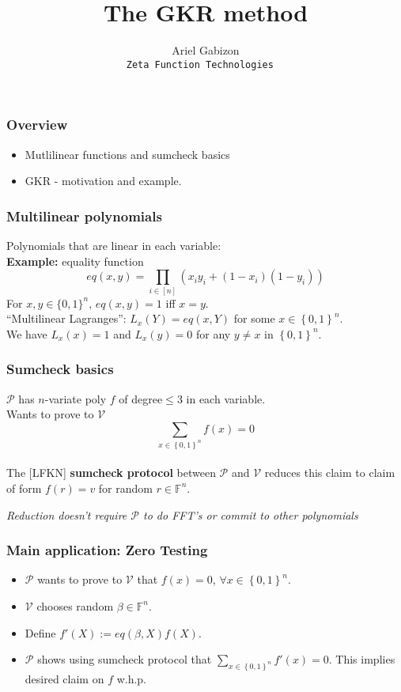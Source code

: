 \documentclass[shadesubsections,compress,14pt,mathserif]{beamer}
\title{\large{The GKR method}}    %
\author{\small{Ariel Gabizon}\\                 %
\tt{\footnotesize{Zeta Function Technologies}                                       } }      %
\date{}                    %
\newcommand{\F}{\ensuremath{{\mathbb F}}}
\newcommand{\set}[1]{\ensuremath{\left\{#1\right\}}}
\newcommand{\bin}{\ensuremath{\set{0,1}}}
\newcommand{\cube}{\ensuremath{\bin^n}}
\newcommand{\defeq}{\ensuremath{:=}}
\newcommand{\ver}{\ensuremath{\mathcal{V}}}
\newcommand{\prv}{\ensuremath{\mathcal{P}}}
\newcommand{\nl}{\\ \pause \vspace{0.2in}}
\begin{document}
\boldmath
\begin{frame}
  \titlepage
\end{frame}


\begin{frame}
 \frametitle{Overview}
 \begin{itemize}
  \item Mutlilinear functions and sumcheck basics
  \item GKR - motivation and example.
 \end{itemize}

\end{frame}


\begin{frame}
 \frametitle{Multilinear polynomials}
 Polynomials that are linear in each variable:\nl 
 \textbf{Example:}
 equality  function\pause
 \[eq(x,y)=\prod_{i\in [n]} (x_i y_i +(1-x_i)(1-y_i))\]\pause
For $x,y \in \{0,1\}^n$, $eq(x,y)=1$ iff $x=y$. \nl
 ``Multilinear Lagranges'': $L_x(Y)=eq(x,Y)$ for some $x\in \cube.$\nl
 We have $L_x(x)=1$ and $L_x(y)=0$ for any $y\neq x$ in $\cube$.
 
\end{frame}

\begin{frame}
 \frametitle{Sumcheck basics}
 $\prv$ has $n$-variate poly $f$ of degree$\leq 3$ in each variable.\nl
 Wants to prove to \ver
 \[\sum_{x\in\cube} f(x)=0\]\nl
 The {\small \color{green}[LFKN]} \textbf{sumcheck protocol} between $\prv$ and $\ver$ reduces this claim
 to claim of form $f(r)=v$ for random $r\in \F^n$.\nl
 
 \emph{Reduction doesn't require $\prv$ to do FFT's or commit to other polynomials }

\end{frame}
\begin{frame}
 \frametitle{Main application: Zero Testing}
 \begin{itemize}
  \item  $\prv$ wants to prove to $\ver$ that $f(x)=0$, $\forall x\in \cube$.\pause
  \item $\ver$ chooses random $\beta \in \F^n$.
  \item Define $f'(X)\defeq eq(\beta,X) f(X)$.\pause
  \item $\prv$ shows using sumcheck protocol that $\sum_{x\in \cube} f'(x)=0$. This implies desired claim on $f$ w.h.p.
  
 \end{itemize}

\end{frame}
\end{document}
